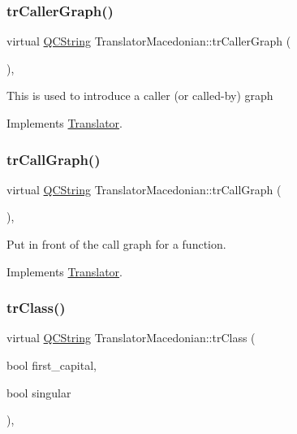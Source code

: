 \subsubsection{\texorpdfstring{trCallerGraph()}{trCallerGraph()}}
{\footnotesize\ttfamily virtual \mbox{\hyperlink{class_q_c_string}{Q\+C\+String}} Translator\+Macedonian\+::tr\+Caller\+Graph (\begin{DoxyParamCaption}{ }\end{DoxyParamCaption})\hspace{0.3cm}{\ttfamily [inline]}, {\ttfamily [virtual]}}

This is used to introduce a caller (or called-\/by) graph 

Implements \mbox{\hyperlink{class_translator}{Translator}}.

\mbox{\label{class_translator_macedonian_a92849623ecdc3821e8c5cdea1ecdb683}} 
\subsubsection{\texorpdfstring{trCallGraph()}{trCallGraph()}}
{\footnotesize\ttfamily virtual \mbox{\hyperlink{class_q_c_string}{Q\+C\+String}} Translator\+Macedonian\+::tr\+Call\+Graph (\begin{DoxyParamCaption}{ }\end{DoxyParamCaption})\hspace{0.3cm}{\ttfamily [inline]}, {\ttfamily [virtual]}}

Put in front of the call graph for a function. 

Implements \mbox{\hyperlink{class_translator}{Translator}}.

\mbox{\label{class_translator_macedonian_aa0fc4ad136ad319368c015554e2863e6}} 
\subsubsection{\texorpdfstring{trClass()}{trClass()}}
{\footnotesize\ttfamily virtual \mbox{\hyperlink{class_q_c_string}{Q\+C\+String}} Translator\+Macedonian\+::tr\+Class (\begin{DoxyParamCaption}\item[{bool}]{first\+\_\+capital,  }\item[{bool}]{singular }\end{DoxyParamCaption})\hspace{0.3cm}{\ttfamily [inline]}, {\ttfamily [virtual]}}

